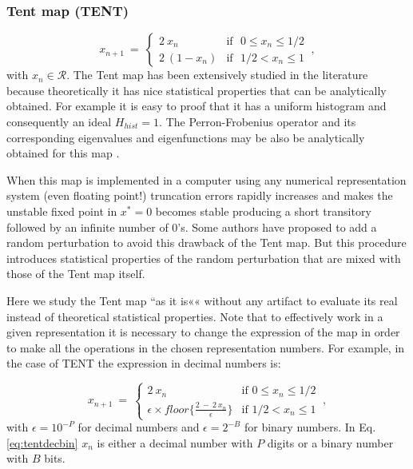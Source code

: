 \subsubsection{Tent map (TENT)} \label{sssec:tent}

\begin{equation}\label{eq:tentmap}
x_{n+1}~=~ \left\{ \begin{array}{ll}
2~{x_n} & \textrm{if ~$0\leq x_n\leq 1/2$}\\
2~(1-{x_n}) & \textrm{if ~$1/2<x_n\leq 1$} 
\end{array} \right.  \ ,
\end{equation}
with $x_n\in\mathcal{R}$.
%
The Tent map has been extensively studied in the literature because theoretically it has nice  statistical properties that can be analytically obtained. For example it is easy to proof that it has a uniform histogram and consequently an ideal $H_{hist}=1$. The Perron-Frobenius operator and its corresponding eigenvalues and eigenfunctions may be also be analytically obtained for this map \cite{tent}. 

When this map is implemented in a computer using any numerical representation system (even floating point!) truncation errors rapidly increases and makes the unstable fixed point in $x^*=0$ becomes stable producing a short transitory followed by an infinite number of  $0$'s\cite{Jessa1993,Callegari1997}. Some authors \cite{buscar} have proposed to add a random perturbation to avoid this drawback of the Tent map. But this procedure introduces statistical properties of the random perturbation that are mixed with those of the Tent map itself.

Here we study the Tent map ``as it is«« without any artifact to evaluate its real instead of theoretical statistical properties. Note that to effectively work in a given representation it is necessary to change the expression of the map in order to make all the operations in the chosen representation numbers. For example, in the case of TENT the expression in decimal numbers is:

\begin{equation}\label{eq:tentdecbin}
x_{n+1}~=~ \left\{ \begin{array}{ll}
2~{x_n} & \textrm{if $0\leq x_n\leq 1/2$}\\
\epsilon \times floor\{\frac{2~-~2~x_n}{\epsilon}\} & \textrm{if $1/2<x_n\leq 1$} 
\end{array} \right.  \ ,
\end{equation}
with $\epsilon=10^{-P}$ for decimal numbers and $\epsilon=2^{-B}$ for binary numbers. In Eq. \ref{eq:tentdecbin} $x_n$ is either a decimal number with $P$ digits or a binary number with $B$ bits.

